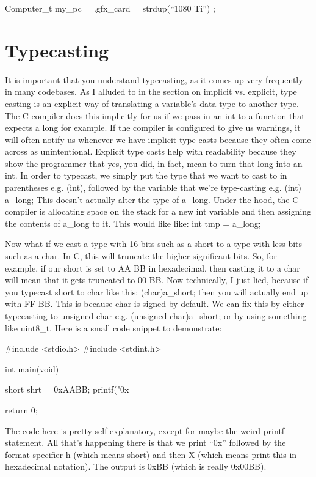 \documentclass{article}
\begin{document}
\begin{cblk}
Computer_t my_pc = { .gfx_card = strdup(“1080 Ti”) };
\end{cblk}

\section{Typecasting}

It is important that you understand typecasting, as it comes up very frequently in many codebases. As I
alluded to in the section on implicit vs. explicit, type casting is an explicit way of translating a
variable’s data type to another type. The C compiler does this implicitly for us if we pass in an int to a
function that expects a long for example. If the compiler is configured to give us warnings, it will often
notify us whenever we have implicit type casts because they often come across as unintentional. Explicit type
casts help with readability because they show the programmer that yes, you did, in fact, mean to turn that
long into an int. In order to typecast, we simply put the type that we want to cast to in parentheses e.g.
(int), followed by the variable that we’re type-casting e.g. (int) a_long; This doesn’t actually alter the
type of a_long. Under the hood, the C compiler is allocating space on the stack for a new int variable and
then assigning the contents of a_long to it. This would like like: int tmp = a_long;

Now what if we cast a type with 16 bits such as a short to a type with less bits such as a char. In C, this
will truncate the higher significant bits. So, for example, if our short is set to AA BB in hexadecimal, then
casting it to a char will mean that it gets truncated to 00 BB. Now technically, I just lied, because if you
typecast short to char like this: (char)a_short; then you will actually end up with FF BB. This is because
char is signed by default. We can fix this by either typecasting to unsigned char e.g.
(unsigned char)a_short; or by using something like uint8_t. Here is a small code snippet to demonstrate:

\begin{cblk}
#include <stdio.h>
#include <stdint.h>

int main(void)
{
   short shrt = 0xAABB;
   printf("0x%

   return 0;
}
\end{cblk}

The code here is pretty self explanatory, except for maybe the weird printf statement. All that’s happening
there is that we print “0x” followed by the format specifier h (which means short) and then X (which means
print this in hexadecimal notation). The output is 0xBB (which is really 0x00BB).
\end{document}

